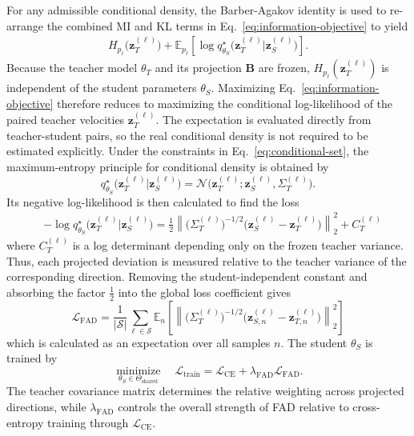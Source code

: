 \documentclass{article}
\newcommand{\E}{\mathbb{E}}
\newcommand{\calL}{\mathcal{L}}
\newcommand{\calS}{\mathcal{S}}
\newcommand{\calN}{\mathcal{N}}
\newcommand{\FAD}{\mathrm{FAD}}
\newcommand{\CE}{\mathrm{CE}}
\newcommand{\bB}{\boldsymbol{B}}
\newcommand{\bz}{\boldsymbol{z}}
\newcommand{\bSigma}{\varSigma}
\theoremstyle{plain}
\theoremstyle{definition}
\theoremstyle{remark}
\begin{document}
For any admissible conditional density, the Barber-Agakov identity
\citep{barber2003im,poole2019variational} is used to re-arrange the combined MI and KL terms in Eq.~\eqref{eq:information-objective} to yield
\begin{equation} \begin{aligned}
 H_{p_\ell} \bigl(\bz_T^{(\ell)} \bigr) + \E_{p_\ell} [ \log
  q_{\theta_S}^{\star} \bigl(\bz_T^{(\ell)} | \bz_S^{(\ell)}
  \bigr) ].
\end{aligned} \label{eq:ba-identity} \end{equation}
Because the teacher model $\theta_T$ and its projection $\bB$ are frozen, $H_{p_\ell}(\bz_T^{(\ell)})$ is independent of the student parameters $\theta_S$. Maximizing Eq.~\eqref{eq:information-objective} therefore reduces to maximizing the conditional log-likelihood of the paired teacher velocities $\bz_T^{(\ell)}$. The expectation is evaluated directly from teacher-student pairs, so the real conditional density is not required to be estimated explicitly. Under the constraints in Eq.~\eqref{eq:conditional-set}, the maximum-entropy principle for conditional density \citep{jaynes1957information} is obtained by
\begin{equation}
q_{\theta_S}^{\star}\bigl( \bz_T^{(\ell)} | \bz_S^{(\ell)} \bigr)
= \calN \bigl(\bz_T^{(\ell)}; \bz_S^{(\ell)}, \bSigma_T^{(\ell)}
\bigr). \label{eq:inner-gauss}
\end{equation}
Its negative log-likelihood is then calculated to find the loss
\begin{equation}
\begin{aligned}
&-\log q_{\theta_S}^{\star} \bigl(\bz_T^{(\ell)} | \bz_S^{(\ell)}
\bigr)= \frac{1}{2} \left\| \bigl(\bSigma_T^{(\ell)} \bigr)^{-1/2}
\bigl(\bz_S^{(\ell)} - \bz_T^{(\ell)} \bigr) \right\|_2^2 +
C_T^{(\ell)}
\end{aligned} \label{eq:gaussian-nll}
\end{equation}
where $C_T^{(\ell)}$ is a log determinant depending only on the frozen teacher variance. Thus, each projected deviation is measured relative to the teacher variance of the corresponding direction. Removing the student-independent constant and absorbing the factor $\frac{1}{2}$ into the global loss coefficient gives
\begin{equation}
\calL_{\FAD} = \frac{1}{|\calS|} \sum_{\ell\in\calS} \E_n \left[ \left\| \bigl( \bSigma_T^{(\ell)}
 \bigr)^{-1/2} \bigl( \bz_{S,n}^{(\ell)} - \bz_{T,n}^{(\ell)} \bigr) \right\|_2^2 \right]
\label{eq:fad} \end{equation}
which is calculated as an expectation over all samples $n$. The student $\theta_S$ is trained by
\begin{equation}
\underset{\theta_S\in\Theta_{\mathrm{shared}}}{\operatorname{minimize}}
\quad\calL_{\mathrm{train}}
=\calL_{\CE}+\lambda_{\FAD}\calL_{\FAD}.
\label{eq:training-objective}
\end{equation}
The teacher covariance matrix determines the relative weighting across projected directions, while $\lambda_{\FAD}$ controls the overall strength of FAD relative to cross-entropy training through $\calL_{\CE}$.
\end{document}
